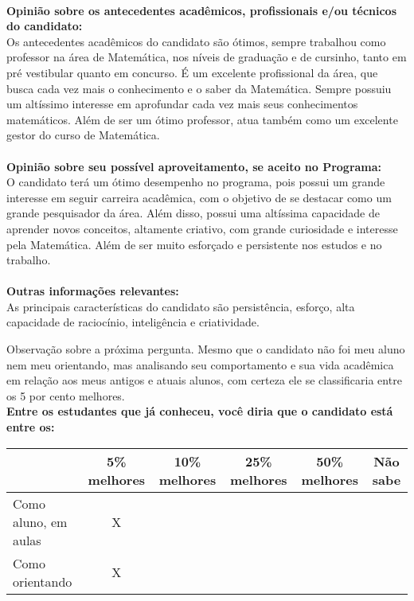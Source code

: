 \documentclass[11pt]{article}
\begin{document}
\\
\textbf{Opinião sobre os antecedentes acadêmicos, profissionais e/ou técnicos do candidato:}
\\Os antecedentes acadêmicos do candidato são ótimos, sempre trabalhou  como professor na área de Matemática, nos níveis de graduação e de cursinho, tanto em pré vestibular quanto em concurso. É um excelente profissional da área, que busca cada vez mais o conhecimento e o saber da Matemática. Sempre possuiu um altíssimo interesse em aprofundar cada vez mais seus conhecimentos matemáticos. Além de ser um ótimo professor, atua também como um excelente gestor do curso de Matemática.\\
\\
\textbf{Opinião sobre seu possível aproveitamento, se aceito no Programa:}
\\O candidato terá um ótimo desempenho no programa, pois possui um grande interesse em seguir carreira acadêmica, com o objetivo de se destacar como um grande pesquisador da área. Além disso, possui uma altíssima capacidade de aprender novos conceitos, altamente criativo, com grande curiosidade e interesse pela Matemática. Além de ser muito esforçado e persistente nos estudos e no trabalho.\\ 
\\
\textbf{Outras informações relevantes:} \\As principais características do candidato são persistência, esforço, alta capacidade de raciocínio, inteligência e criatividade. 

Observação sobre a  próxima pergunta. Mesmo que o candidato não foi meu aluno nem meu orientando, mas analisando seu comportamento e sua vida acadêmica em relação aos meus antigos e atuais alunos, com certeza ele se classificaria entre os 5 por cento melhores.
\\[0.3cm]
\textbf{Entre os estudantes que já conheceu, você diria que o candidato está entre os:}
\\
\begin{tabular}{|l|c|c|c|c|c|}
\hline
 & 5\% melhores & 10\% melhores & 25\% melhores & 50\% melhores & Não sabe \\
\hline
Como aluno, em aulas & X &  &  &  & \\
\hline
Como orientando & X &  &  &  & \\
\hline
\end{tabular}
\end{document}
